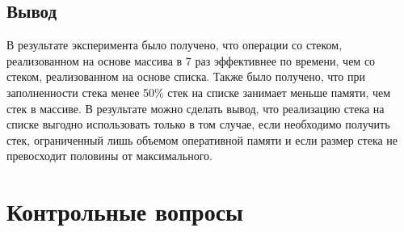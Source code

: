 \section{Вывод}

В результате эксперимента было получено, что операции со стеком, реализованном на основе массива в 7 раз эффективнее по времени, чем со стеком, реализованном на основе списка. Также было получено, что при заполненности стека менее 50\% стек на списке занимает меньше памяти, чем стек в массиве. В результате можно сделать вывод, что реализацию стека на списке выгодно использовать только в том случае, если необходимо получить стек, ограниченный лишь объемом оперативной памяти и если размер стека не превосходит половины от максимального.

\chapter{Контрольные вопросы}

